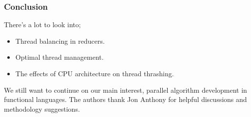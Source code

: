 \documentclass{beamer}
\begin{document}
\begin{frame}
\frametitle{Conclusion}
	There's a lot to look into;
	\begin{itemize}
	\item Thread balancing in reducers.
	\item Optimal thread management.
	\item The effects of CPU architecture on thread thrashing.
	\end{itemize}
We still want to continue on our main interest, parallel algorithm development in functional languages.
\break
The authors thank Jon Anthony for helpful discussions and methodology suggestions. 
\end{frame}
\end{document}
